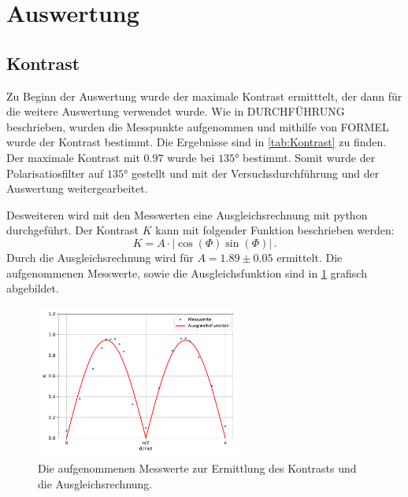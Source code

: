 \section{Auswertung}
\label{sec:Auswertung}

\subsection{Kontrast}
\label{subsec:Kontrast}
Zu Beginn der Auswertung wurde der maximale Kontrast ermitttelt, der dann für die weitere Auswertung verwendet wurde.
Wie in DURCHFÜHRUNG beschrieben, wurden die Messpunkte aufgenommen und mithilfe von FORMEL wurde der Kontrast bestimmt.
Die Ergebnisse sind in \ref{tab:Kontrast} zu finden.
Der maximale Kontrast mit $0.97$ wurde bei $135°$ bestimmt.
Somit wurde der Polarisatiosfilter auf $135°$ gestellt und mit der Versuchsdurchführung und der Auswertung weitergearbeitet.

\noindent
Desweiteren wird mit den Messwerten eine Ausgleichsrechnung mit python durchgeführt.
Der Kontrast $K$ kann mit folgender Funktion beschrieben werden:
\begin{equation*}
  K = A \cdot | \cos(\Phi)\sin(\Phi) | \, .
\end{equation*}
Durch die Ausgleichsrechnung wird für $A = 1.89 \pm 0.05$ ermittelt.
Die aufgenommenen Messwerte, sowie die Ausgleichsfunktion sind in \ref{fig:Kontrast_Ausgleich} grafisch abgebildet.

\begin{figure}
  \centering
  \includegraphics[width=0.6\textwidth]{build/kontrast_ausgleich.pdf}
  \caption{Die aufgenommenen Messwerte zur Ermittlung des Kontrasts und die Ausgleichsrechnung.}
  \label{fig:Kontrast_Ausgleich}
\end{figure}

